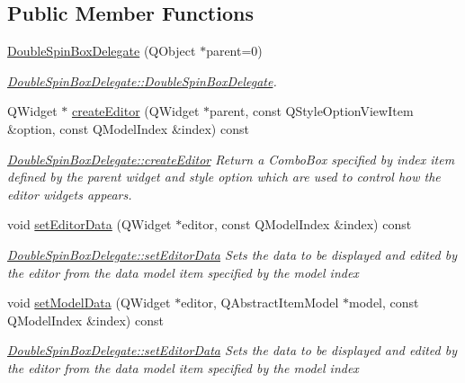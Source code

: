 \subsection*{Public Member Functions}
\begin{DoxyCompactItemize}
\item 
\hyperlink{classGui_1_1Widgets_1_1Delegates_1_1DoubleSpinBoxDelegate_a6d7df575ca17247028df99296fd2cf88}{Double\-Spin\-Box\-Delegate} (Q\-Object $\ast$parent=0)
\begin{DoxyCompactList}\small\item\em \hyperlink{classGui_1_1Widgets_1_1Delegates_1_1DoubleSpinBoxDelegate_a6d7df575ca17247028df99296fd2cf88}{Double\-Spin\-Box\-Delegate\-::\-Double\-Spin\-Box\-Delegate}. \end{DoxyCompactList}\item 
Q\-Widget $\ast$ \hyperlink{classGui_1_1Widgets_1_1Delegates_1_1DoubleSpinBoxDelegate_a681be1ef9cc0db4e315bc2cb8f7690be}{create\-Editor} (Q\-Widget $\ast$parent, const Q\-Style\-Option\-View\-Item \&option, const Q\-Model\-Index \&index) const 
\begin{DoxyCompactList}\small\item\em \hyperlink{classGui_1_1Widgets_1_1Delegates_1_1DoubleSpinBoxDelegate_a681be1ef9cc0db4e315bc2cb8f7690be}{Double\-Spin\-Box\-Delegate\-::create\-Editor} Return a Combo\-Box specified by {\itshape index} item defined by the {\itshape parent} widget and style {\itshape option} which are used to control how the editor widgets appears. \end{DoxyCompactList}\item 
void \hyperlink{classGui_1_1Widgets_1_1Delegates_1_1DoubleSpinBoxDelegate_a60bb2e12c0b0398c74d0e8c95304d7e4}{set\-Editor\-Data} (Q\-Widget $\ast$editor, const Q\-Model\-Index \&index) const 
\begin{DoxyCompactList}\small\item\em \hyperlink{classGui_1_1Widgets_1_1Delegates_1_1DoubleSpinBoxDelegate_a60bb2e12c0b0398c74d0e8c95304d7e4}{Double\-Spin\-Box\-Delegate\-::set\-Editor\-Data} Sets the data to be displayed and edited by the {\itshape editor} from the data model item specified by the model {\itshape index} \end{DoxyCompactList}\item 
void \hyperlink{classGui_1_1Widgets_1_1Delegates_1_1DoubleSpinBoxDelegate_a9c07f33b62b05f64979f52e9fead2553}{set\-Model\-Data} (Q\-Widget $\ast$editor, Q\-Abstract\-Item\-Model $\ast$model, const Q\-Model\-Index \&index) const 
\begin{DoxyCompactList}\small\item\em \hyperlink{classGui_1_1Widgets_1_1Delegates_1_1DoubleSpinBoxDelegate_a60bb2e12c0b0398c74d0e8c95304d7e4}{Double\-Spin\-Box\-Delegate\-::set\-Editor\-Data} Sets the data to be displayed and edited by the {\itshape editor} from the data model item specified by the model {\itshape index} \end{DoxyCompactList}\item 

\end{DoxyCompactItemize}
